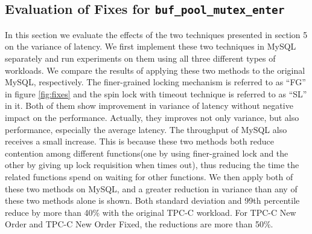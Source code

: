 \subsection{Evaluation of Fixes for \texttt{buf\_pool\_mutex\_enter}}
In this section we evaluate the effects of the two techniques presented in
section 5 on the variance of latency. We first implement these two techniques
in MySQL separately and run experiments on them using all three different
types of workloads. We compare the results of applying these two methods to
the original MySQL, respectively. The finer-grained locking mechanism is
referred to as ``FG'' in figure \ref{fig:fixes} and the spin lock with timeout
technique is referred to as ``SL'' in it. Both of them show improvement in
variance of latency without negative impact on the performance. Actually, they
improves not only variance, but also performance, especially the average
latency. The throughput of MySQL also receives a small increase. This is
because these two methods both reduce contention among different functions(one
by using finer-grained lock and the other by giving up lock requisition when
times out), thus reducing the time the related functions spend on waiting for
other functions. We then apply both of these two methods on MySQL, and a
greater reduction in variance than any of these two methods alone is shown.
Both standard deviation and 99th percentile reduce by more than 40\% with the
original TPC-C workload. For TPC-C New Order and TPC-C New Order Fixed, the
reductions are more than 50\%.

